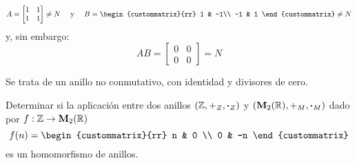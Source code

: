 \[ A = \begin{bmatrix}
	1 & 1\\
	1 & 1
\end{bmatrix} \ne N \quad \mbox{ y } \quad B = \begin{custommatrix}{rr}
1 & -1\\
-1 & 1
\end{custommatrix} \ne N \]
y, sin embargo:
\[ AB = \begin{bmatrix}
	0 & 0\\
	0 & 0
\end{bmatrix} = N\]

Se trata de un anillo no conmutativo, con identidad y divisores de cero.

\begin{fmd-example}
	Determinar si la aplicación entre dos anillos $(\mathbb{Z}, +_Z, \boldsymbol{\cdot}_Z)$ y $(\mathbf{M}_2(\mathbb{R}), +_M, \boldsymbol{\cdot}_M)$ dado por $f: \mathbb{Z} \rightarrow \mathbf{M}_2(\mathbb{R})$
	\[ f(n) = \begin{custommatrix}{rr}
		n & 0 \\ 0 & -n
	\end{custommatrix} \]
	es un homomorfismo de anillos.
	

\end{fmd-example}

